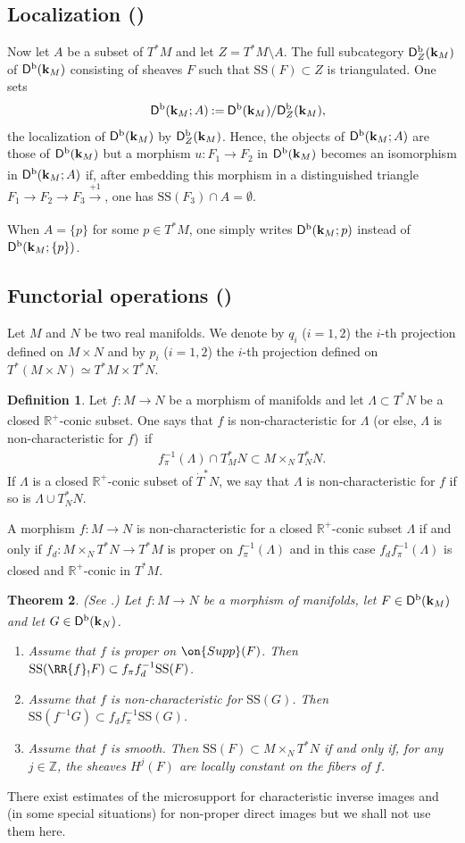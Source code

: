 \documentclass[12pt,leqno]{article}
\newtheorem{theorem}{Theorem}[section]
\theoremstyle{definition}
\newtheorem{definition}[theorem]{Definition}
\newcommand{\R}{{\mathbb{R}}}
\newcommand{\Z}{{\mathbb{Z}}}
\newcommand{\cor}{{\bf k}}
\renewcommand{\to}[1][]{\xrightarrow[]{#1}}
\newcommand{\reim}[1]{\RR{#1}_!}
\newcommand{\opb}[1]{#1^{-1}}
\newcommand{\eqdot}{\mathbin{:=}}
\newcommand{\cl}{\colon}
\newcommand{\lp}{{\rm(}}
\newcommand{\rp}{{\rm)}}
\newcommand{\bnum}{\begin{enumerate}[{\rm(i)}]}
\newcommand{\enum}{\end{enumerate}}
\newcommand{\eqn}{\begin{eqnarray*}}
\newcommand{\eneqn}{\end{eqnarray*}}
\newcommand{\Supp}{\on{Supp}}
\newcommand{\Der}[1][]{\mathsf{D}^{#1}}
\newcommand{\Derb}{\Der[\mathrm{b}]}
\newcommand{\SSi}{\mathrm{SS}}
\newcommand{\dT}{{\dot{T}}}
\numberwithin{equation}{section}
\begin{document}
\subsection{Localization (\cite[\S 6.1]{KS90})}
Now let $A$ be a subset of $T^*M$ and let $Z=T^*M\setminus A$. The full
subcategory $\Derb_Z(\cor_M)$ of $\Derb(\cor_M)$ consisting of sheaves $F$
such that $\SSi(F)\subset Z$ is triangulated. One sets
\eqn
&& \Derb(\cor_M;A)\eqdot \Derb(\cor_M)/\Derb_Z(\cor_M),
\eneqn
the localization of $\Derb(\cor_M)$ by $\Derb_Z(\cor_M)$. Hence, the
objects of $\Derb(\cor_M;A)$ are those of $\Derb(\cor_M)$ but a
morphism $u\cl F_1\to F_2$ in $\Derb(\cor_M)$ becomes an isomorphism
in $\Derb(\cor_M;A)$ if, after embedding  this morphism in a distinguished
triangle $F_1\to F_2\to F_3\to[+1]$, one has $\SSi(F_3)\cap A=\emptyset$. 

When $A=\{p\}$ for some $p\in T^*M$, one simply writes 
$\Derb(\cor_M;p)$ instead of $\Derb(\cor_M;\{p\})$.


\subsection{Functorial operations (\cite[\S 5.4]{KS90})}
Let $M$ and $N$ be two real manifolds. We denote by $q_i$ ($i=1,2$)
the $i$-th projection defined on $M\times N$ and by $p_i$ ($i=1,2$)
the $i$-th projection defined on $T^*(M\times N)\simeq T^*M\times T^*N$.

\begin{definition}
Let $f\cl M\to N$ be a morphism of manifolds and let 
$\Lambda\subset T^*N$ be a closed $\R^+$-conic subset. One says that 
$f$ is non-characteristic for $\Lambda$ \lp or else, $\Lambda$ 
is non-characteristic for $f$\rp\, if
\eqn
&&\opb{f_\pi}(\Lambda)\cap T^*_MN\subset M\times_NT^*_NN.
\eneqn
If $\Lambda$ is a closed $\R^+$-conic subset of $\dT^*N$, we say that
$\Lambda$ is non-characteristic for $f$ if so is $\Lambda\cup T^*_NN$.
\end{definition}
A morphism $f\cl M\to N$ is non-characteristic for a closed
$\R^+$-conic subset $\Lambda$ if and
only if $f_d\cl M\times_NT^*N\to T^*M$ is proper on $\opb{f_\pi}(\Lambda)$
and in this case 
$f_d\opb{f_\pi}(\Lambda)$ is closed and $\R^+$-conic in $T^*M$.

\begin{theorem}\label{th:opboim}\rm{(See \cite[\S 5.4]{KS90}.)}
Let $f\cl M\to N$ be a morphism of manifolds, let
$F\in\Derb(\cor_M)$ and let $G\in\Derb(\cor_N)$.
\bnum
\item
Assume that $f$ is proper on $\Supp(F)$. Then
  $\SSi(\reim{f}F)\subset f_\pi\opb{f_d}\SSi(F)$.
\item
Assume that $f$ is non-characteristic for $\SSi(G)$. Then
$\SSi(\opb{f}G)\subset f_d\opb{f_\pi}\SSi(G)$.
\item
Assume that $f$ is smooth. Then $\SSi(F)\subset M\times_NT^*N$
if and only if, for any $j\in\Z$, the sheaves $H^j(F)$
are  locally constant on the fibers of $f$.
\enum
\end{theorem}
There exist estimates of the microsupport for characteristic inverse images
and (in some special situations) for non-proper direct images but we shall not
use them here.
\end{document}
